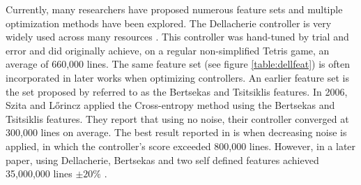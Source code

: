 Currently, many researchers have proposed numerous 
feature sets and multiple 
optimization methods have been explored. 
The Dellacherie controller is very widely used across many resources
\citep{fahey}. This controller was hand-tuned by trial and error 
and did originally achieve, on a regular non-simplified Tetris game, an average of
660,000 lines. The same feature set (see figure \ref{table:dellfeat}) is 
often incorporated in later works when optimizing controllers. An earlier
feature set is the set proposed by \citep{Bertsekas} referred to as the Bertsekas and
Tsitsiklis features. In 2006, Szita and L\H{o}rincz \citep{szita:06} applied the Cross-entropy
method using the Bertsekas and Tsitsiklis features. They report that using no noise,
their controller converged at 300,000 lines on average. 
The best result reported in \citep{szita:06}
is when decreasing noise is applied, 
in which the controller's score exceeded 800,000 lines. 
However, in a later paper, using Dellacherie, 
Bertsekas and two self defined features achieved 
35,000,000 lines $\pm 20\%$  \citep{scherrer2009}.\\


